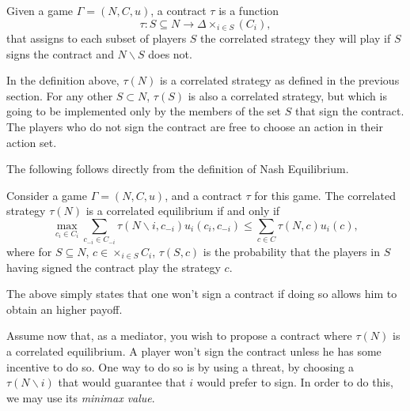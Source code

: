 \begin{definition}[Contract]
Given a game $\Gamma = (N,C,u)$, a contract $\tau$ is a function
$$ \tau : S \subseteq N \rightarrow \Delta \times_{i \in S}(C_i), $$
that assigns to each subset of players $S$ the correlated strategy  they will play if $S$ signs the contract and $N \backslash S$ does not.
\end{definition}

In the definition above, $\tau(N)$ is a correlated strategy as defined in the previous section. For any other $S \subset N$, $\tau(S)$ is also a correlated strategy, but which is going to be implemented only by the members of the set $S$ that sign the contract.
The players who do not sign the contract are free to choose an action in their action set.

The following follows directly from the definition of Nash Equilibrium.
\begin{proposition}
Consider a game $\Gamma = (N,C,u)$, and a contract $\tau$ for this game. The correlated strategy $\tau(N)$ is a correlated equilibrium if and only if
$$ \max_{c_i \in C_i} \sum_{c_{-i} \in C_{-i}} \tau(N \backslash i, c_{-i})u_i(c_i, c_{-i}) \leq \sum_{c \in C} \tau(N, c) u_{i}(c),$$
where for $S \subseteq N$, $c \in \times_{i \in S} C_i$, $\tau(S,c)$ is the probability that the players in $S$ having signed the contract play the strategy $c$.
\end{proposition}
The above simply states that one won't sign a contract if doing so allows him to obtain an higher payoff.

Assume now that, as a mediator, you wish to propose a contract where $\tau(N)$ is a correlated equilibrium. A player won't sign the contract unless he has some incentive to do so. One way to do so is by using a threat, by choosing  a $\tau(N \backslash i)$ that would guarantee that $i$ would prefer to sign. In order to do this, we may use its \emph{minimax value}.

